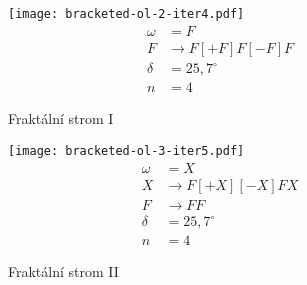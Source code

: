 \begin{figure}[p]
    \centering
    \texttt{[image: bracketed-ol-2-iter4.pdf]}
    \begin{align*}
        \omega&=F\\
        F&\to F[+F]F[-F]F\\
        \delta&=25{,}7^\circ\\
        n&=4
    \end{align*}
    \caption{Fraktální strom I}
    \label{fig:lsystem-fraktalni-strom-i}
\end{figure}
\begin{figure}[p]
    \centering
    \texttt{[image: bracketed-ol-3-iter5.pdf]}
    \begin{align*}
        \omega&=X\\
        X&\to F[+X][-X]FX\\
        F&\to FF\\
        \delta&=25{,}7^\circ\\
        n&=4
    \end{align*}
    \caption{Fraktální strom II}
    \label{fig:lsystem-fraktalni-strom-ii}
\end{figure}
